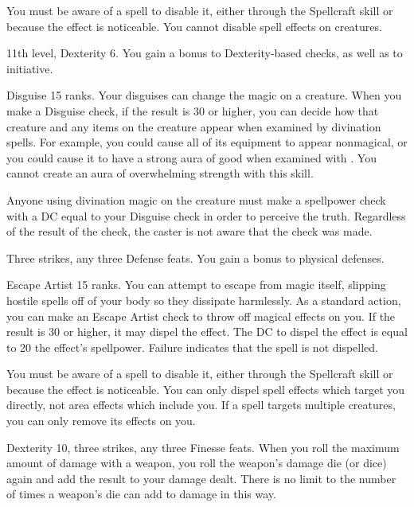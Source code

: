 You must be aware of a spell to disable it, either through the Spellcraft skill or because the effect is noticeable.
You cannot disable spell effects on creatures.

\featpres 11th level, Dexterity 6.
\featben You gain a  bonus to Dexterity-based checks, as well as to initiative.

\featpre Disguise 15 ranks.
\featben Your disguises can change the magic on a creature.
When you make a Disguise check, if the result is 30 or higher, you can decide how that creature and any items on the creature appear when examined by divination spells.
For example, you could cause all of its equipment to appear nonmagical, or you could cause it to have a strong aura of good when examined with .
You cannot create an aura of overwhelming strength with this skill.

Anyone using divination magic on the creature must make a spellpower check with a DC equal to your Disguise check in order to perceive the truth.
Regardless of the result of the check, the caster is not aware that the check was made.

\featpres Three strikes, any three Defense feats.
\featben You gain a  bonus to physical defenses.

\featpre Escape Artist 15 ranks.
\featben You can attempt to escape from magic itself, slipping hostile spells off of your body so they dissipate harmlessly.
As a standard action, you can make an Escape Artist check to throw off magical effects on you.
If the result is 30 or higher, it may dispel the effect.
The DC to dispel the effect is equal to 20 \add the effect's spellpower.
Failure indicates that the spell is not dispelled.

You must be aware of a spell to disable it, either through the Spellcraft skill or because the effect is noticeable.
You can only dispel spell effects which target you directly, not area effects which include you.
If a spell targets multiple creatures, you can only remove its effects on you.

\featpres Dexterity 10, three strikes, any three Finesse feats.
\featben When you roll the maximum amount of damage with a weapon, you roll the weapon's damage die (or dice) again and add the result to your damage dealt.
There is no limit to the number of times a weapon's die can add to damage in this way.

